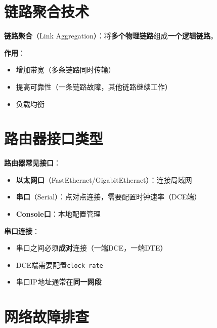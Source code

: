 \documentclass[12pt,a4paper]{ctexart}
\begin{document}
\section{链路聚合技术}

\begin{keybox}
\textbf{链路聚合}（Link Aggregation）：将\textbf{多个物理链路}组成\textbf{一个逻辑链路}。

\textbf{作用}：
\begin{itemize}[itemsep=0pt]
    \item 增加带宽（多条链路同时传输）
    \item 提高可靠性（一条链路故障，其他链路继续工作）
    \item 负载均衡
\end{itemize}
\end{keybox}

\section{路由器接口类型}

\begin{keybox}
\textbf{路由器常见接口}：

\begin{itemize}[itemsep=0pt]
    \item \textbf{以太网口}（FastEthernet/GigabitEthernet）：连接局域网
    \item \textbf{串口}（Serial）：点对点连接，需要配置时钟速率（DCE端）
    \item \textbf{Console口}：本地配置管理
\end{itemize}

\textbf{串口连接}：
\begin{itemize}[itemsep=0pt]
    \item 串口之间必须\textbf{成对}连接（一端DCE，一端DTE）
    \item DCE端需要配置\texttt{clock rate}
    \item 串口IP地址通常在\textbf{同一网段}
\end{itemize}
\end{keybox}

\section{网络故障排查}
\end{document}
